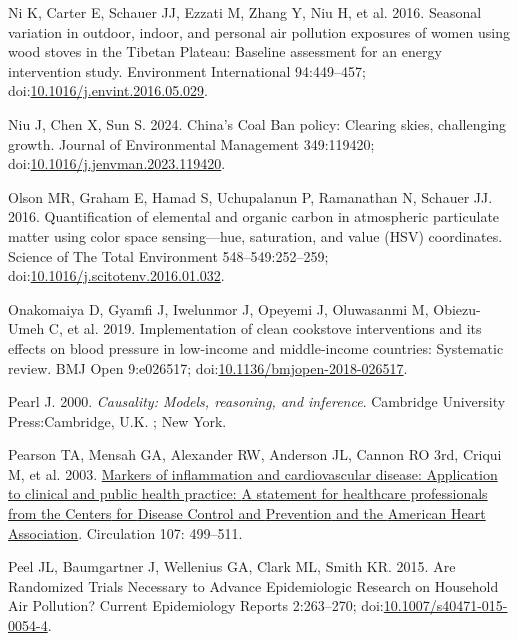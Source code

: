 \documentclass[
  letterpaper,
  DIV=11,
  numbers=noendperiod]{scrartcl}
\newlength{\cslhangindent}
\newenvironment{CSLReferences}[2] %
 {\begin{list}{}{%
  \setlength{\itemindent}{0pt}
  \setlength{\leftmargin}{0pt}
  \setlength{\parsep}{0pt}
  \ifodd #1
   \setlength{\leftmargin}{\cslhangindent}
   \setlength{\itemindent}{-1\cslhangindent}
  \fi
  \setlength{\itemsep}{#2\baselineskip}}}
 {\end{list}}
\begin{document}
\begin{CSLReferences}{1}{1}
Ni K, Carter E, Schauer JJ, Ezzati M, Zhang Y, Niu H, et al. 2016.
Seasonal variation in outdoor, indoor, and personal air pollution
exposures of women using wood stoves in the {Tibetan Plateau}:
{Baseline} assessment for an energy intervention study. Environment
International 94:449--457;
doi:\href{https://doi.org/10.1016/j.envint.2016.05.029}{10.1016/j.envint.2016.05.029}.

Niu J, Chen X, Sun S. 2024. China's {Coal Ban} policy: {Clearing} skies,
challenging growth. Journal of Environmental Management 349:119420;
doi:\href{https://doi.org/10.1016/j.jenvman.2023.119420}{10.1016/j.jenvman.2023.119420}.

Olson MR, Graham E, Hamad S, Uchupalanun P, Ramanathan N, Schauer JJ.
2016. Quantification of elemental and organic carbon in atmospheric
particulate matter using color space sensing---hue, saturation, and
value ({HSV}) coordinates. Science of The Total Environment
548--549:252--259;
doi:\href{https://doi.org/10.1016/j.scitotenv.2016.01.032}{10.1016/j.scitotenv.2016.01.032}.

Onakomaiya D, Gyamfi J, Iwelunmor J, Opeyemi J, Oluwasanmi M,
Obiezu-Umeh C, et al. 2019. Implementation of clean cookstove
interventions and its effects on blood pressure in low-income and
middle-income countries: Systematic review. BMJ Open 9:e026517;
doi:\href{https://doi.org/10.1136/bmjopen-2018-026517}{10.1136/bmjopen-2018-026517}.

Pearl J. 2000. \emph{Causality: Models, reasoning, and inference}.
Cambridge University Press:Cambridge, U.K. ; New York.

Pearson TA, Mensah GA, Alexander RW, Anderson JL, Cannon RO 3rd, Criqui
M, et al. 2003.
\href{https://www.ncbi.nlm.nih.gov/pubmed/12551878}{Markers of
inflammation and cardiovascular disease: Application to clinical and
public health practice: {A} statement for healthcare professionals from
the {Centers} for {Disease Control} and {Prevention} and the {American
Heart Association}}. Circulation 107: 499--511.

Peel JL, Baumgartner J, Wellenius GA, Clark ML, Smith KR. 2015. Are
{Randomized Trials Necessary} to {Advance Epidemiologic Research} on
{Household Air Pollution}? Current Epidemiology Reports 2:263--270;
doi:\href{https://doi.org/10.1007/s40471-015-0054-4}{10.1007/s40471-015-0054-4}.


\end{CSLReferences}
\end{document}
